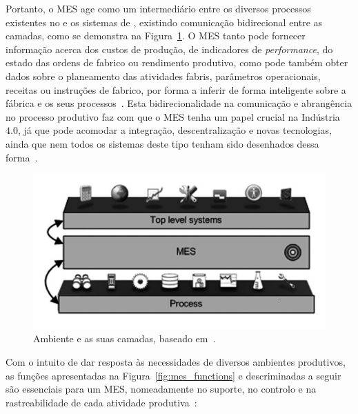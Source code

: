 Portanto, o \gls{MES} age como um intermediário entre os diversos processos existentes no  e os sistemas de , existindo comunicação bidirecional entre as camadas, como se demonstra na Figura~\ref{fig:mes_layers}. O \gls{MES} tanto pode fornecer informação acerca dos custos de produção, de indicadores de \textit{performance}, do estado das ordens de fabrico ou rendimento produtivo, como pode também obter dados sobre o planeamento das atividades fabris, parâmetros operacionais, receitas ou instruções de fabrico, por forma a inferir de forma inteligente sobre a fábrica e os seus processos~\parencite{mes_explained_high_level_vision}. Esta bidirecionalidade na comunicação e abrangência no processo produtivo faz com que o \gls{MES} tenha um papel crucial na Indústria $4.0$, já que pode acomodar a integração, descentralização e novas tecnologias, ainda que nem todos os sistemas deste tipo tenham sido desenhados dessa forma~\parencite{cmf_mes_definition}.

\begin{figure}[!ht]
    \centering
    \includegraphics[width=.75\textwidth]{ch2/assets/mes_layers.jpg}
    \caption{Ambiente  e as suas camadas, baseado em~\textcite[p.~526]{mes_literature_review}.}
    \label{fig:mes_layers}
\end{figure}

Com o intuito de dar resposta às necessidades de diversos ambientes produtivos, as funções apresentadas na Figura~\ref{fig:mes_functions} e descriminadas a seguir são essenciais para um \gls{MES}, nomeadamente no suporte, no controlo e na rastreabilidade de cada atividade produtiva~\parencite{mes_literature_review, mes_explained_high_level_vision, introduction_mes}:

